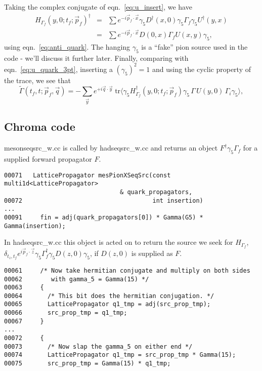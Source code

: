 \documentclass[12pt]{article}
\newcommand{\pfdotx}{\vec{p}_f \cdot \vec{x}}
\newcommand{\pfdotz}{\vec{p}_f \cdot \vec{z}}
\begin{document}
Taking the complex conjugate of eqn.~\ref{eq:u_insert}, we have 
\begin{eqnarray}
H_{\Gamma_f} (y,0; t_f; \vec{p}_f)^{\dagger} & = & \sum e^{-i\pfdotx}\gamma_5
D^{\dagger}(x,0)\gamma_5 \Gamma_f \gamma_5  U^{\dagger}(y,x)\nonumber\\
& = & \sum e^{-i\pfdotx} D(0,x) \Gamma_f U(x,y) \gamma_5,
\end{eqnarray}
using eqn.~\ref{eq:anti_quark}. The hanging $\gamma_5$ is a ``fake'' pion source used in the code - we'll discuss it further later. Finally, comparing with
eqn.~\ref{eq:u_quark_3pt}, inserting a $(\gamma_5)^2 =1 $ and using the cyclic property of the trace,
we see that
\begin{equation}
\tilde{\Gamma}(t_f, t; \vec{p}_f, \vec{q}) = - \sum_{\vec{y}} e^{+i\vec{q}\cdot\vec{y}} \;   \mathrm{tr} \Big\langle \gamma_5 H_{\Gamma_f}^\dag(y, 0; t_f; \vec{p}_f) \gamma_5  \, \Gamma\, U(y,0)\, \Gamma_i \gamma_5  \Big\rangle ,
\label{eq:u_quark_3pt_final}
\end{equation}

\subsection{Chroma code}

mesonseqsrc\_w.cc is called by hadseqsrc\_w.cc and returns an object  $F^\dag \gamma_5 \Gamma_f$ for a supplied forward propagator $F$.
\begin{verbatim}
00071   LatticePropagator mesPionXSeqSrc(const multi1d<LatticePropagator>
                                & quark_propagators,
00072                                    int insertion)
...
00091     fin = adj(quark_propagators[0]) * Gamma(G5) * Gamma(insertion);
\end{verbatim}
In hadseqsrc\_w.cc this object is acted on to return the source we seek for $H_{\Gamma_f}$, $\delta_{t_z, t_f} e^{i
  \pfdotz} \gamma_5 \Gamma_f^\dag \gamma_5 D(z,0) \gamma_5 $, if $D(z,0)$ is supplied as $F$.
\begin{verbatim}
00061     /* Now take hermitian conjugate and multiply on both sides
00062        with gamma_5 = Gamma(15) */
00063     {
00064       /* This bit does the hermitian conjugation. */
00065       LatticePropagator q1_tmp = adj(src_prop_tmp);
00066       src_prop_tmp = q1_tmp;
00067     }
...
00072     {
00073       /* Now slap the gamma_5 on either end */
00074       LatticePropagator q1_tmp = src_prop_tmp * Gamma(15);
00075       src_prop_tmp = Gamma(15) * q1_tmp;
\end{verbatim}
\end{document}
